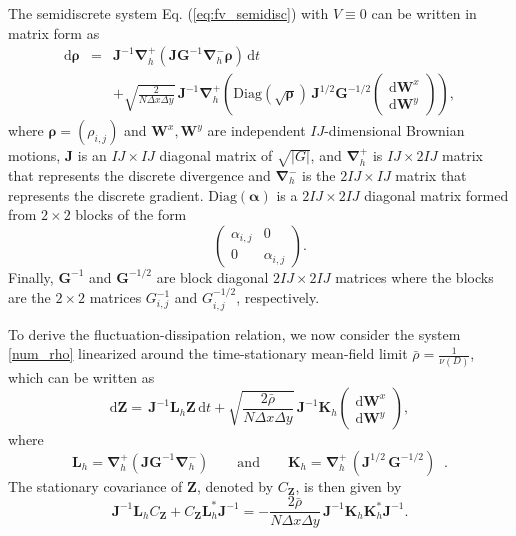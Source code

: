 \documentclass[11pt, a4paper]{article}
\newcommand{\mathd}{\mathrm{d}}
\newcommand{\jacdat}{\sqrt{|G|}}
\begin{document}
The semidiscrete system Eq. (\ref{eq:fv_semidisc}) with $V\equiv0$ can be written in matrix form as
\begin{eqnarray}\label{num_rho}
    \mathd\boldsymbol{\rho}&=& \mathbf{J}^{-1} \boldsymbol{\nabla}_h^+ (\mathbf{J} %
    \mathbf{G}^{-1}  \boldsymbol{\nabla}_h^-\boldsymbol{\rho})\, \mathd t \nonumber \\
    && + \sqrt{\frac{2}{N \Delta x \Delta y}} \, \mathbf{J}^{-1}
    \boldsymbol{\nabla}_h^+  \left( \mathrm{Diag}(\boldsymbol{\sqrt{\rho}}) \,\mathbf{J}^{1/2} \mathbf{G}^{-1/2}
    \begin{pmatrix}
        \mathd\mathbf{W}^x \\[.1cm]
        \mathd\mathbf{W}^y
    \end{pmatrix}\right),
    \label{eq:fv_matdisc}
\end{eqnarray}
where $\boldsymbol{\rho}=(\rho_{i,j})$ and $\mathbf{W}^x, \mathbf W^y$ are independent $IJ$-dimensional Brownian motions, $\mathbf{J}$ is an $IJ \times IJ$ diagonal matrix of $\jacdat$, and $\boldsymbol{\nabla}_h^+$ is $IJ \times 2IJ$ matrix that represents the discrete divergence and $\boldsymbol{\nabla}_h^-$ is the $2IJ \times IJ$ matrix that represents the discrete gradient.
$\mathrm{Diag}(\boldsymbol{\alpha})$ is a $2IJ \times 2IJ$ diagonal matrix formed from $2\times 2$ blocks of the form 
\[
\begin{pmatrix}
    \alpha_{i,j} & 0 \\ 0 & \alpha_{i,j}
\end{pmatrix} .
\]
Finally, $\mathbf{G}^{-1}$ and $\mathbf{G}^{-1/2}$ are block diagonal $2IJ \times 2IJ$ matrices where the blocks are the $2\times 2$ matrices $G_{i,j}^{-1}$ and $G_{i,j}^{-1/2}$, respectively.


To derive the fluctuation-dissipation relation, we now consider the system \eqref{num_rho} linearized around the time-stationary mean-field limit $\bar{\rho} = \frac{1}{\nu(D)}$, which can be written as
\begin{equation}
     \mathd\boldsymbol{Z}= \, \mathbf{J}^{-1} \mathbf{L}_h \boldsymbol{Z}\, \mathd t 
    +\sqrt{\frac{2 \bar{\rho}}{N \Delta x \Delta y}} \, \mathbf{J}^{-1}
    \mathbf{K}_h
    \begin{pmatrix}
        \mathd\mathbf{W}^x \\[.1cm]
        \mathd\mathbf{W}^y
    \end{pmatrix},
    \label{eq:fv_matdiscequil}
\end{equation}
where
\[
\mathbf{L}_h = \boldsymbol{\nabla}_h^+ (\mathbf{J} \mathbf{G}^{-1}  \boldsymbol{\nabla}_h^-)
\qquad \mathrm{and} \qquad  \mathbf{K}_h = \boldsymbol{\nabla}_h^+  \,(\mathbf{J}^{1/2}\, \mathbf{G}^{-1/2}) \;\;.
\]
The stationary covariance of $\boldsymbol{Z}$, denoted by $C_{\boldsymbol{Z}}$, is then given by
\begin{equation}\label{eq_Z}
\mathbf{J}^{-1} \mathbf{L}_h C_{\boldsymbol{Z}} + C_{\boldsymbol{Z}} \mathbf{L}_h^* \mathbf{J}^{-1} = 
- \frac{2 \bar{\rho}}{N \Delta x \Delta y} \, \mathbf{J}^{-1}
    \mathbf{K}_h \mathbf{K}_h^* \mathbf{J}^{-1}.
\end{equation}
\end{document}
